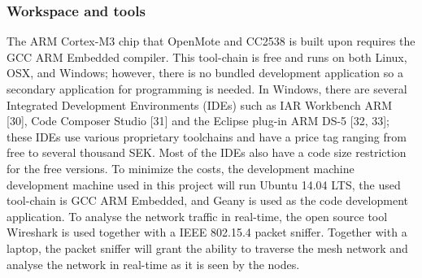 \subsubsection{Workspace and tools}

The ARM Cortex-M3 chip that OpenMote and CC2538 is built upon requires the GCC ARM Embedded compiler.
This tool-chain is free and runs on both Linux,
	OSX,
	and Windows;
	however,
	there is no bundled development application so a secondary application for programming is needed.
In Windows,
	there are several Integrated Development Environments (IDEs) such as IAR Workbench ARM [30],
	Code Composer Studio [31] and the Eclipse plug-in ARM DS-5 [32, 33];
	these IDEs use various proprietary toolchains and have a price tag ranging from free to several thousand SEK.
Most of the IDEs also have a code size restriction for the free versions.
To minimize the costs,
	the development machine development machine used in this project will run Ubuntu 14.04 LTS,
	the used tool-chain is GCC ARM Embedded,
	and Geany is used as the code development application.
To analyse the network traffic in real-time,
	the open source tool Wireshark is used together with a IEEE 802.15.4 packet sniffer.
Together with a laptop,
	the packet sniffer will grant the ability to traverse the mesh network and analyse the network in real-time as it is seen by the nodes.


